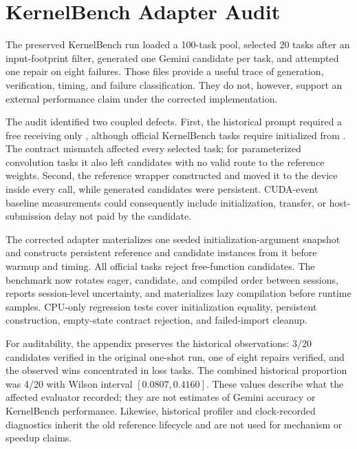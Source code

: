 \FloatBarrier

\section{KernelBench Adapter Audit}

The preserved KernelBench run loaded a 100-task pool, selected 20 tasks after an input-footprint filter, generated one Gemini candidate per task, and attempted one repair on eight failures. Those files provide a useful trace of generation, verification, timing, and failure classification. They do not, however, support an external performance claim under the corrected implementation.



The audit identified two coupled defects. First, the historical prompt required a free  receiving only , although official KernelBench tasks require  initialized from . The contract mismatch affected every selected task; for parameterized convolution tasks it also left candidates with no valid route to the reference weights. Second, the reference wrapper constructed  and moved it to the device inside every call, while generated candidates were persistent. CUDA-event baseline measurements could consequently include initialization, transfer, or host-submission delay not paid by the candidate.

The corrected adapter materializes one seeded initialization-argument snapshot and constructs persistent reference  and candidate  instances from it before warmup and timing. All official  tasks reject free-function candidates. The benchmark now rotates eager, candidate, and compiled order between sessions, reports session-level uncertainty, and materializes lazy compilation before runtime samples. CPU-only regression tests cover initialization equality, persistent construction, empty-state contract rejection, and failed-import cleanup.

For auditability, the appendix preserves the historical observations: 3/20 candidates verified in the original one-shot run, one of eight repairs verified, and the observed wins concentrated in loss tasks. The combined historical proportion was 4/20 with Wilson interval $[0.0807, 0.4160]$. These values describe what the affected evaluator recorded; they are not estimates of Gemini accuracy or KernelBench performance. Likewise, historical profiler and clock-recorded diagnostics inherit the old reference lifecycle and are not used for mechanism or speedup claims.

